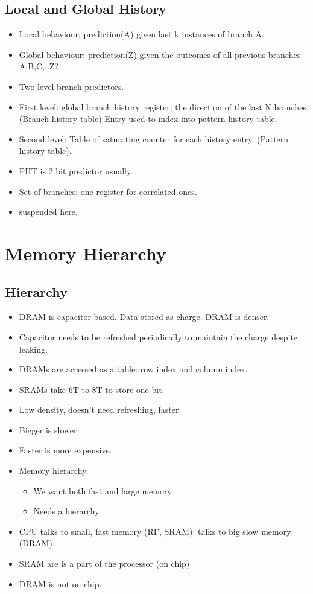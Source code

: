 \documentclass{report}
\begin{document}
\subsection{Local and Global History}
\begin{itemize}
\item Local behaviour: prediction(A) given last k instances of branch A.
\item Global behaviour: prediction(Z) given the outcomes of all previous branches A,B,C,..Z?
\item Two level branch predictors.
\item First level: global branch history register; the direction of the last N branches. (Branch history table) Entry used to index into pattern history table.
\item Second level: Table of saturating counter for each history entry. (Pattern history table).
\item PHT is 2 bit predictor usually.
\item Set of branches: one register for correlated ones.
\item suspended here.
\end{itemize}
\section{Memory Hierarchy}
\subsection{Hierarchy}
\begin{itemize}
\item DRAM is capacitor based. Data stored as charge. DRAM is denser.
\item Capacitor needs to be refreshed periodically to maintain the charge despite leaking.
\item DRAMs are accessed as a table: row index and column index.
\item SRAMs take 6T to 8T to store one bit.
\item Low density, doesn't need refreshing, faster.
\item Bigger is slower.
\item Faster is more expensive.
\item Memory hierarchy.
\begin{itemize}
\item We want both fast and large memory.
\item Needs a hierarchy.
\end{itemize}
\item CPU talks to small, fast memory (RF, SRAM): talks to big slow memory (DRAM).
\item SRAM are is a part of the processor (on chip)
\item DRAM is not on chip. 
\end{itemize}
\end{document}
